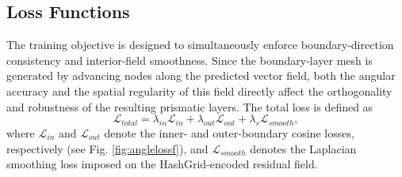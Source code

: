 \documentclass[%
 aip,
 amsmath,amssymb,
 reprint,%
nobibnotes,
]{revtex4-1}
\begin{document}
\subsection{\label{sec:level1-6}Loss Functions}

The training objective is designed to simultaneously enforce boundary-direction consistency and interior-field smoothness.
Since the boundary-layer mesh is generated by advancing nodes along the predicted vector field, both the angular accuracy and the spatial regularity of this field directly affect the orthogonality and robustness of the resulting prismatic layers.
The total loss is defined as
\begin{equation}
    \mathcal{L}_{total}
    =
    \lambda_{in}\mathcal{L}_{in}
    +
    \lambda_{out}\mathcal{L}_{out}
    +
    \lambda_{s}\mathcal{L}_{smooth},
    \label{eq:total_loss}
\end{equation}
where $\mathcal{L}_{in}$ and $\mathcal{L}_{out}$ denote the inner- and outer-boundary cosine losses, respectively (see Fig. \ref{fig:anglelossf}),
 and $\mathcal{L}_{smooth}$ denotes the Laplacian smoothing loss imposed on the HashGrid-encoded residual field.
\end{document}
